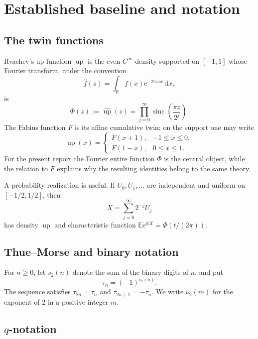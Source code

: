 \documentclass[11pt,oneside]{article}
\numberwithin{equation}{section}
\theoremstyle{plain}
\theoremstyle{definition}
\theoremstyle{remark}
\newcommand{\Up}{\operatorname{up}}
\newcommand{\sinc}{\operatorname{sinc}}
\newcommand{\dd}{\,\mathrm{d}}
\newcommand{\R}{\mathbb R}
\newcommand{\tm}{\tau}
\newcommand{\e}{\mathrm e}
\begin{document}
\section{Established baseline and notation}

\subsection{The twin functions}

Rvachev's up-function $\Up$ is the even $C^\infty$ density supported on $[-1,1]$ whose Fourier transform, under the convention
\[
 \widehat f(z)=\int_{\R}f(x)\e^{-2\pi i z x}\dd x,
\]
is
\begin{equation}\label{eq:Phi-sinc}
 \Phi(z):=\widehat{\Up}(z)
 =\prod_{j=0}^{\infty}\sinc\!\left(\frac{\pi z}{2^j}\right).
\end{equation}
The Fabius function $F$ is its affine cumulative twin; on the support one may write
\[
 \Up(x)=
 \begin{cases}
 F(x+1),&-1\le x\le0,\\
 F(1-x),&0\le x\le1.
 \end{cases}
\]
For the present report the Fourier entire function $\Phi$ is the central object, while the relation to $F$ explains why the resulting identities belong to the same theory.

A probability realization is useful.  If $U_0,U_1,\ldots$ are independent and uniform on $[-1/2,1/2]$, then
\begin{equation}\label{eq:prob-sum}
 X=\sum_{j=0}^{\infty}2^{-j}U_j
\end{equation}
has density $\Up$ and characteristic function $\mathbb E\e^{itX}=\Phi(t/(2\pi))$.

\subsection{Thue--Morse and binary notation}

For $n\ge0$, let $s_2(n)$ denote the sum of the binary digits of $n$, and put
\begin{equation}\label{eq:tm}
 \tm_n=(-1)^{s_2(n)}.
\end{equation}
The sequence satisfies $\tm_{2n}=\tm_n$ and $\tm_{2n+1}=-\tm_n$.  We write $\nu_2(m)$ for the exponent of $2$ in a positive integer $m$.

\subsection{$q$-notation}
\end{document}
